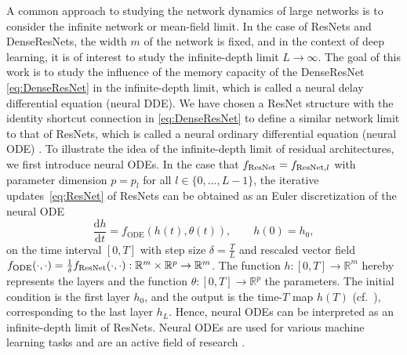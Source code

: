 \documentclass[10pt]{article}
\numberwithin{equation}{section}
\newcommand*{\dd}{\mathrm{d}}
\newcommand{\R}{\mathbb{R}}
\begin{document}
	
	A common approach to studying the network dynamics of large networks is to consider the infinite network or mean-field limit. In the case of ResNets and DenseResNets, the width $m$ of the network is fixed, and in the context of deep learning, it is of interest to study the infinite-depth limit $L \rightarrow \infty$. The goal of this work is to study the influence of the memory capacity of the DenseResNet \eqref{eq:DenseResNet} in the infinite-depth limit, which is called a neural delay differential equation (neural DDE). We have chosen a ResNet structure with the identity shortcut connection in \eqref{eq:DenseResNet} to define a similar network limit to that of ResNets, which is called a neural ordinary differential equation (neural ODE) \cite{Chen2018,Ruthotto2018,Weinan2017}. To illustrate the idea of the infinite-depth limit of residual architectures, we first introduce neural ODEs.
	In the case that $f_\textup{ResNet} = f_{\textup{ResNet},l}$ with parameter dimension $p =p_l$ for all $l \in \{0,\ldots,L-1\}$, the iterative updates~\eqref{eq:ResNet} of ResNets can be obtained as an Euler discretization of the neural ODE
	\begin{equation}\label{eq:neuralODE}
		\frac{\dd h}{\dd t} = f_\text{ODE}(h(t),\theta(t)), \qquad h(0) = h_0,
	\end{equation}
	on the time interval $[0,T]$ with step size $\delta = \frac{T}{L}$ and rescaled vector field $f_\textup{ODE}(\cdot,\cdot) = \frac{1}{\delta} f_\textup{ResNet}(\cdot,\cdot):\R^m\times\R^p\rightarrow \R^m$. The function $h:[0,T]\rightarrow  \mathbb{R}^m$ hereby represents the layers and the function $\theta:[0,T]\rightarrow  \mathbb{R}^{p}$ the parameters. The initial condition is the first layer $h_0$, and the output is the \mbox{time-$T$} map $h(T)$ (cf.~\cite{Guckenheimer2002}), corresponding to the last layer $h_L$. Hence, neural ODEs can be interpreted as an infinite-depth limit of ResNets. Neural ODEs are used for various machine learning tasks and are an active field of research \cite{Cipriani2024, Kidger2022, Kuehn2023, Kuehn2024, RuizBalet2023}. 
	
\end{document}

